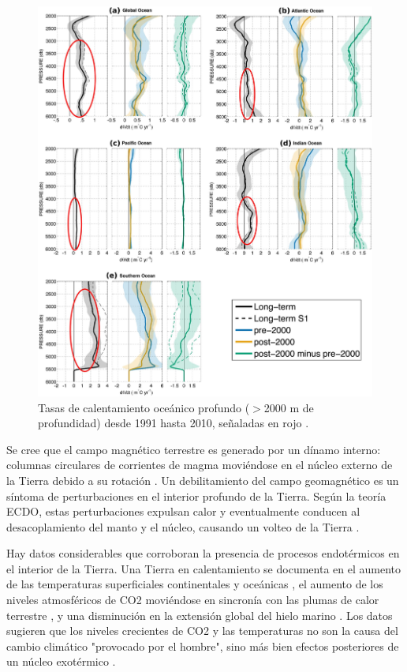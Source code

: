 \documentclass[10pt,twocolumn,letterpaper]{article}
\begin{document}
\begin{figure}[t]
\begin{center}
   \includegraphics[width=1\linewidth]{ocean-highlight.jpg}
\end{center}
   \caption{Tasas de calentamiento oceánico profundo ($>$2000 m de profundidad) desde 1991 hasta 2010, señaladas en rojo \cite{132}.}
\label{fig:15}
\label{fig:onecol}
\end{figure}

Se cree que el campo magnético terrestre es generado por un dínamo interno: columnas circulares de corrientes de magma moviéndose en el núcleo externo de la Tierra debido a su rotación \cite{123}. Un debilitamiento del campo geomagnético es un síntoma de perturbaciones en el interior profundo de la Tierra. Según la teoría ECDO, estas perturbaciones expulsan calor y eventualmente conducen al desacoplamiento del manto y el núcleo, causando un volteo de la Tierra \cite{1}.

Hay datos considerables que corroboran la presencia de procesos endotérmicos en el interior de la Tierra. Una Tierra en calentamiento se documenta en el aumento de las temperaturas superficiales continentales y oceánicas \cite{127,128}, el aumento de los niveles atmosféricos de CO2 moviéndose en sincronía con las plumas de calor terrestre \cite{129,130}, y una disminución en la extensión global del hielo marino \cite{131}. Los datos sugieren que los niveles crecientes de CO2 y las temperaturas no son la causa del cambio climático "provocado por el hombre", sino más bien efectos posteriores de un núcleo exotérmico \cite{129}.
\end{document}
